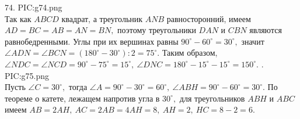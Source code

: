 74.  {{PIC:g74.png}}\\
Так как $ABCD$ квадрат, а треугольник $ANB$ равносторонний, имеем $AD=BC=AB=AN=BN,$ поэтому треугольники $DAN$ и $CBN$ являются равнобедренными. Углы при их вершинах равны $90^\circ-60^\circ=30^\circ,$ значит $\angle ADN=\angle BCN=(180^\circ-30^\circ):2=75^\circ.$ Таким образом, $\angle NDC=\angle NCD=90^\circ-75^\circ=15^\circ,\ \angle DNC=180^\circ-15^\circ-15^\circ=150^\circ.$\newpage
{}. {{PIC:g75.png}}\\
Пусть $\angle C=30^\circ,$ тогда $\angle A=90^\circ-30^\circ=60^\circ,\ \angle ABH=90^\circ-60^\circ=30^\circ.$ По теореме о катете, лежащем напротив угла в $30^\circ,$ для треугольников $ABH$ и $ABC$ имеем $AB=2AH,\ AC=2AB=4AH=8,\ AH=2,\ HC=8-2=6.$\\
